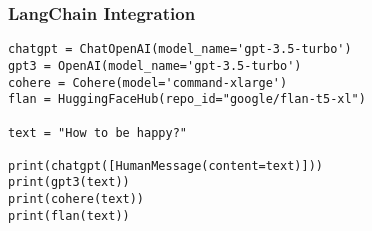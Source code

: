 \begin{frame}[fragile]\frametitle{LangChain Integration}

\begin{lstlisting}
chatgpt = ChatOpenAI(model_name='gpt-3.5-turbo')
gpt3 = OpenAI(model_name='gpt-3.5-turbo')
cohere = Cohere(model='command-xlarge')
flan = HuggingFaceHub(repo_id="google/flan-t5-xl")

text = "How to be happy?"

print(chatgpt([HumanMessage(content=text)]))
print(gpt3(text))
print(cohere(text))
print(flan(text))
\end{lstlisting}	  

\end{frame}
